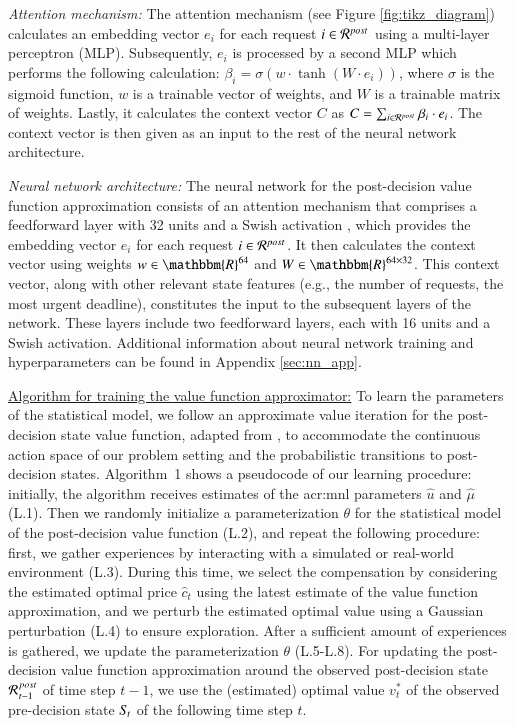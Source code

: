 \noindent \textit{Attention mechanism:} The attention mechanism (see Figure \ref{fig:tikz_diagram}) calculates an embedding vector $e_i$ for each request $i \in \mathcal{R}^{post}\hspace{0.05em}$ using a multi-layer perceptron (MLP). Subsequently, $e_i$ is processed by a second MLP which performs the following calculation: $\beta_{i} = \sigma(w \cdot \tanh(W \cdot e_{i}))$, where $\sigma$ is the sigmoid function, $w$ is a trainable vector of weights, and $W$ is a trainable matrix of weights. Lastly, it calculates the context vector $C$ as $C = \sum_{i \in \mathcal{R}^{post}\hspace{0.05em}} \beta_{i} \cdot e_{i}$. The context vector is then given as an input to the rest of the neural network architecture. 

\noindent \textit{Neural network architecture:} The neural network for the post-decision value function approximation consists of an attention mechanism that comprises a feedforward layer with 32 units and a Swish activation \citep{ramachandran2017searching}, which provides the embedding vector $e_i$ for each request $i \in \mathcal{R}^{post}\hspace{0.05em}$. It then calculates the context vector using weights $w \in \mathbbm{R}^{64}$ and $W \in \mathbbm{R}^{64 \times 32}$. This context vector, along with other relevant state features (e.g., the number of requests, the most urgent deadline), constitutes the input to the subsequent layers of the network. These layers include two feedforward layers, each with 16 units and a Swish activation. Additional information about neural network training and hyperparameters can be found in Appendix \ref{sec:nn_app}. 

\noindent \underline{Algorithm for training the value function approximator:} To learn the parameters of the statistical model, we follow an approximate value iteration for the post-decision state value function, adapted from \cite{powell2021reinforcement}, to accommodate the continuous action space of our problem setting and the probabilistic transitions to post-decision states. Algorithm~1 shows a pseudocode of our learning procedure: initially, the algorithm receives estimates of the \gls{acr:mnl} parameters $\hat{\mathit{u}}$ and $\hat{\mu}$ (L.1). Then we randomly initialize a parameterization $\theta$ for the statistical model of the post-decision value function (L.2), and repeat the following procedure: first, we gather experiences by interacting with a simulated or real-world environment (L.3). During this time, we select the compensation by considering the estimated optimal price $\hat{c}_{t}$ using the latest estimate of the value function approximation, and we perturb the estimated optimal value using a Gaussian perturbation (L.4) to ensure exploration. After a sufficient amount of experiences is gathered, we update the parameterization $\theta$ (L.5-L.8). For updating the post-decision value function approximation around the observed post-decision state $\mathcal{R}\hspace{0.05em}_{t-1}^{post}$ of time step $t-1$, we use the (estimated) optimal value $v_t^*$ of the observed pre-decision state $S\hspace{-0.1em}_t$ of the following time step $t$.

